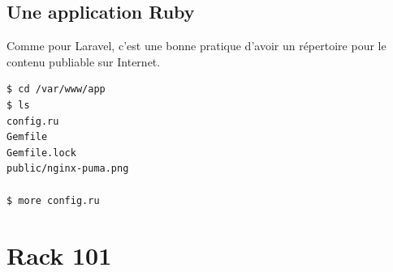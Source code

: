 \begin{english}

\begin{Shaded}
\begin{Highlighting}[]
\end{Highlighting}
\end{Shaded}

\end{english}

\hypertarget{une-application-ruby}{%
\subsection{Une application Ruby}\label{une-application-ruby}}

Comme pour Laravel, c'est une bonne pratique d'avoir un répertoire pour
le contenu publiable sur Internet.

\begin{english}

\begin{verbatim}
$ cd /var/www/app
$ ls
config.ru
Gemfile
Gemfile.lock
public/nginx-puma.png

$ more config.ru
\end{verbatim}

\end{english}

\hypertarget{rack-101}{%
\section{Rack 101}\label{rack-101}}

\begin{english}

\begin{Shaded}
\begin{Highlighting}[]
\NormalTok{  [}
    \NormalTok{,}
\NormalTok{    \{}\NormalTok{ =\textgreater{} }\NormalTok{\},}
\NormalTok{    [}
      \NormalTok{,}
      \NormalTok{,}
      \NormalTok{,}
      \NormalTok{,}
\NormalTok{    ]}
\NormalTok{  ]}
\end{Highlighting}
\end{Shaded}

\end{english}

